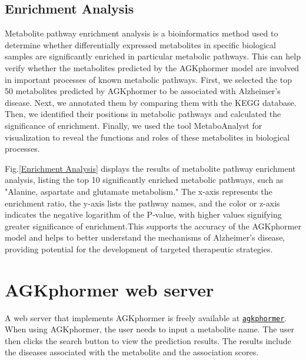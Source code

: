 \documentclass[a4paper,fleqn]{cas-dc}
\begin{document}
\subsection{Enrichment Analysis}

Metabolite pathway enrichment analysis is a bioinformatics method used to determine whether differentially expressed metabolites in specific biological samples are significantly enriched in particular metabolic pathways. This can help verify whether the metabolites predicted by the AGKphormer model are involved in important processes of known metabolic pathways. First, we selected the top 50 metabolites predicted by AGKphormer to be associated with Alzheimer's disease. Next, we annotated them by comparing them with the KEGG database\cite{kanehisa10new}. Then, we identified their positions in metabolic pathways and calculated the significance of enrichment. Finally, we used the tool MetaboAnalyst\cite{pang2024metaboanalyst} for visualization to reveal the functions and roles of these metabolites in biological processes.

Fig.\ref{Enrichment Analysis} displays the results of metabolite pathway enrichment analysis, listing the top 10 significantly enriched metabolic pathways, such as "Alanine, aspartate and glutamate metabolism." The x-axis represents the enrichment ratio, the y-axis lists the pathway names, and the color or z-axis indicates the negative logarithm of the P-value, with higher values signifying greater significance of enrichment.This supports the accuracy of the AGKphormer model and helps to better understand the mechanisms of Alzheimer's disease, providing potential for the development of targeted therapeutic strategies.





\section{AGKphormer web server}
A web server that implements AGKphormer is freely available at  
\href{https://lutgraphgroup.github.io/agkphormer.github.io/}  
{\texttt{agkphormer}}.  
When using AGKphormer, the user needs to input a metabolite name. The user then clicks the search button to view the prediction results. The results include the diseases associated with the metabolite and the association scores.
\end{document}
